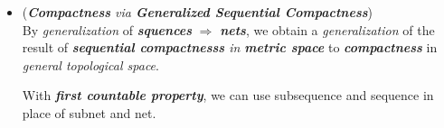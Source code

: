 \documentclass[11pt]{article}
\begin{document}
\begin{itemize}
\begin{proof}
To prove $\Leftarrow$, let $\srA$ be a collection of
\emph{\textbf{closed sets}} having \emph{the finite intersection property}, and let $\srB$ be the collection of
\emph{all finite intersections} of elements of $\srA$, \emph{\textbf{partially ordered}} by \emph{reverse inclusion}.
\end{proof}

\item \begin{remark} (\emph{\textbf{Compactness} via \textbf{Generalized Sequential Compactness}})\\
By \emph{generalization} of \emph{\textbf{squences}} $\Rightarrow$ \emph{\textbf{nets}}, we obtain a  \emph{generalization} of the result of \emph{\textbf{sequential compactnesss} in \textbf{metric space}} to \emph{\textbf{compactness}} in \emph{general topological space}.

With \emph{\textbf{first countable property}}, we can use subsequence and sequence in place of subnet and net.
\end{remark}
\end{itemize}
\newpage


\end{document}
